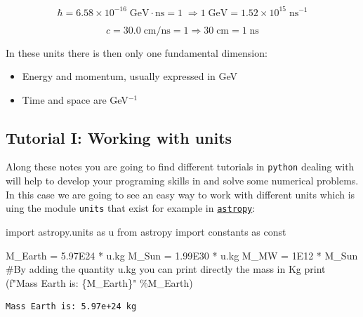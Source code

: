 \documentclass[
  letterpaper,
  DIV=11,
  numbers=noendperiod]{scrreprt}
\newenvironment{Shaded}{\begin{snugshade}}{\end{snugshade}}
\newcommand{\BuiltInTok}[1]{\textcolor[rgb]{0.00,0.23,0.31}{#1}}
\newcommand{\CommentTok}[1]{\textcolor[rgb]{0.37,0.37,0.37}{#1}}
\newcommand{\FloatTok}[1]{\textcolor[rgb]{0.68,0.00,0.00}{#1}}
\newcommand{\ImportTok}[1]{\textcolor[rgb]{0.00,0.46,0.62}{#1}}
\newcommand{\NormalTok}[1]{\textcolor[rgb]{0.00,0.23,0.31}{#1}}
\newcommand{\OperatorTok}[1]{\textcolor[rgb]{0.37,0.37,0.37}{#1}}
\newcommand{\SpecialCharTok}[1]{\textcolor[rgb]{0.37,0.37,0.37}{#1}}
\newcommand{\SpecialStringTok}[1]{\textcolor[rgb]{0.13,0.47,0.30}{#1}}
\providecommand{\tightlist}{%
  \setlength{\itemsep}{0pt}\setlength{\parskip}{0pt}}\usepackage{longtable,booktabs,array}
\begin{document}
\[\hbar = 6.58 \times 10^{-16} {\;\mathrm{ GeV}\cdot \mathrm{ ns}} = 1\;\Rightarrow 1\;\mathrm{ GeV} = 1.52 \times 10^{15}\;{\mathrm{ ns}^{-1}}\]

\[c = 30.0\;\mathrm{ cm/ns} = 1 \Rightarrow 30\;\mathrm{ cm} = 1\;\mathrm{ ns}\]

In these units there is then only one fundamental dimension:

\begin{itemize}
\tightlist
\item
  Energy and momentum, usually expressed in GeV
\item
  Time and space are GeV\(^{-1}\)
\end{itemize}

\subsection*{Tutorial I: Working with
units}\label{tutorial-i-working-with-units}

Along these notes you are going to find different tutorials in
\texttt{python} dealing with will help to develop your programing skills
in and solve some numerical problems. In this case we are going to see
an easy way to work with different units which is uing the module
\texttt{units} that exist for example in
\href{http://astropy.readthedocs.org/en/latest/units/}{\texttt{astropy}}:

\begin{Shaded}
\begin{Highlighting}[]
\ImportTok{import}\NormalTok{ astropy.units }\ImportTok{as}\NormalTok{ u}
\ImportTok{from}\NormalTok{ astropy }\ImportTok{import}\NormalTok{ constants }\ImportTok{as}\NormalTok{ const}

\NormalTok{M\_Earth }\OperatorTok{=} \FloatTok{5.97E24} \OperatorTok{*}\NormalTok{ u.kg}
\NormalTok{M\_Sun }\OperatorTok{=} \FloatTok{1.99E30} \OperatorTok{*}\NormalTok{ u.kg}
\NormalTok{M\_MW  }\OperatorTok{=} \FloatTok{1E12} \OperatorTok{*}\NormalTok{ M\_Sun}
\CommentTok{\#By adding the quantity u.kg you can print directly the mass in Kg}
\BuiltInTok{print}\NormalTok{ (}\SpecialStringTok{f"Mass Earth is: }\SpecialCharTok{\{}\NormalTok{M\_Earth}\SpecialCharTok{\}}\SpecialStringTok{"} \OperatorTok{\%}\NormalTok{M\_Earth)}
\end{Highlighting}
\end{Shaded}

\begin{verbatim}
Mass Earth is: 5.97e+24 kg
\end{verbatim}
\end{document}
